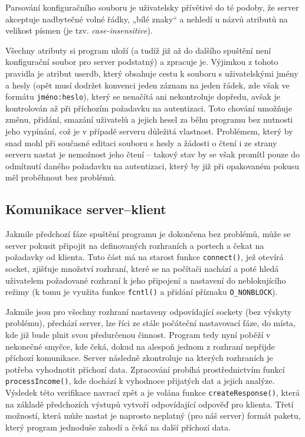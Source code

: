\documentclass[12pt,a4paper,titlepage,final]{article}
\begin{document}
Parsování konfiguračního souboru je uživatelsky přívětivé do té podoby, že server akceptuje nadbytečné volné řádky, „bílé znaky“ a nehledí u názvů atributů na velikost písmen (je tzv. \textit{case-insensitive}).

Všechny atributy si program uloží (a tudíž již až do dalšího spuštění není konfigurační soubor pro server podstatný) a zpracuje je. Výjimkou z tohoto pravidla je atribut userdb, který obsahuje cestu k souboru s uživatelskými jmény a hesly (opět musí dodržet konvenci jeden záznam na jeden řádek, zde však ve formátu \texttt{jméno:heslo}), který se nenačítá ani nekontroluje dopředu, avšak je kontrolován až při příchozím požadavku na autentizaci. Toto chování umožňuje změnu, přidání, smazání uživatelů a jejich hesel za běhu programu bez nutnosti jeho vypínání, což je v případě serveru důležitá vlastnost. Problémem, který by snad mohl při současné editaci souboru s hesly a žádosti o čtení i ze strany serveru nastat je nemožnost jeho čtení – takový stav by se však promítl pouze do odmítnutí daného požadavku na autentizaci, který by již při opakovaném pokusu měl  proběhnout bez problémů.

\subsection{Komunikace server–klient}
Jakmile předchozí fáze spuštění programu je dokončena bez problémů, může se server pokusit připojit na definovaných rozhraních a portech a čekat na požadavky od klienta. Tuto část má na starost funkce \texttt{connect()}, jež otevírá socket, zjišťuje množství rozhraní, které se na počítači nachází a poté hledá uživatelem požadované rozhraní k jeho připojení a nastavení do neblokujícího režimy (k tomu je využita funkce \texttt{fcntl()} a přidání příznaku \texttt{O\_NONBLOCK}).

Jakmile jsou pro všechny rozhraní nastaveny odpovídající sockety (bez výskyty problému), přechází server, lze říci ze stále počáteční nastavovací fáze, do místa, kde již bude plnit svou předurčenou činnost. Program tedy nyní poběží v nekonečné smyčce, kde čeká, dokud na alespoň jednom z rozhraní nepřijde příchozí komunikace. Server následně zkontroluje na kterých rozhraních je potřeba vyhodnotit příchozí data. Zpracování probíhá prostřednictvím funkcí \texttt{processIncome()}, kde dochází k vyhodnoce přijatých dat a jejich analýze. Výsledek této verifikace navrací zpět a je volána funkce \texttt{createResponse()}, která na základě předchozích výstupů vytvoří odpovídající odpověď pro klienta. Třetí možností, která může nastat je naprosto neplatný (pro náš server) formát paketu, který program jednoduše zahodí a čeká na další příchozí data.
			   
\end{document}
